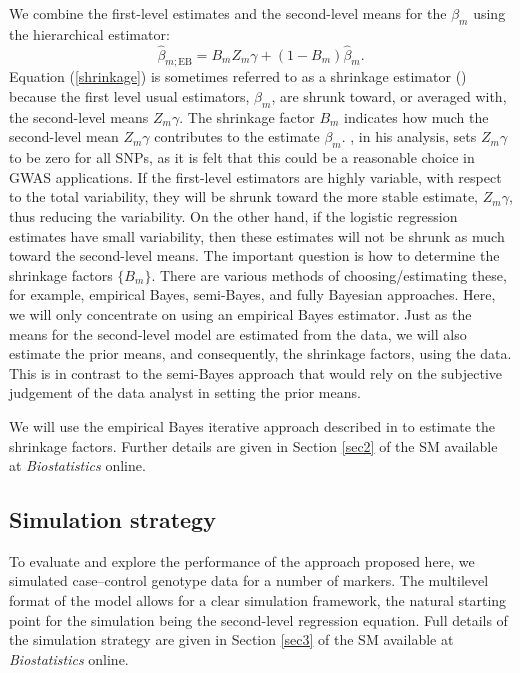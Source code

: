 We combine the first-level estimates and the second-level means
for the $\beta_m$ using the hierarchical estimator:
\begin{equation}
\hat{\beta}_{m; \mathrm{EB}} =
B_m Z_m \gamma + \left( 1 - B_m \right) \hat{\beta}_m.
\label{shrinkage}
\end{equation}
Equation (\ref{shrinkage}) is sometimes referred to as a
shrinkage estimator
(\citealp{TTC01})
because the first level usual
estimators, $\beta_m$, are shrunk toward, or averaged with,
the second-level means $Z_m \gamma$. The shrinkage factor
$B_m$ indicates how much the second-level mean $Z_m \gamma$
contributes to the estimate $\beta_m$.
\citet{Gichangi_Vach:2006},
in his analysis, sets $Z_m \gamma$ to be zero for all SNPs,
as it is felt that this could be a reasonable choice in GWAS
applications. If the first-level estimators are highly
variable, with respect to the total variability, they will
be shrunk toward the more stable estimate, $Z_m \gamma$,
thus reducing the variability. On the other hand, if the
logistic regression estimates have small variability, then
these estimates will not be shrunk as much toward the
second-level means. The important question is how to
determine the shrinkage factors $\{ B_m \}$. There are
various methods of choosing/estimating these, for example,
empirical Bayes, semi-Bayes, and fully Bayesian approaches.
Here, we will only concentrate on using an empirical Bayes
estimator. Just as the means for the second-level model are
estimated from the data, we will also estimate the prior means,
and consequently, the shrinkage factors, using the data.
This is in contrast to the semi-Bayes approach that would
rely on the subjective judgement of the data analyst in
setting the prior means.

We will use the empirical Bayes iterative approach described
in
\citet{Barlow_Bartholomew:1972}
to estimate the shrinkage factors. Further details are
given in Section \ref{sec2} of the SM available at
\textit{Biostatistics} online.


\subsection{Simulation strategy}

To evaluate and explore the performance of the approach
proposed here, we simulated case--control genotype data for
a number of markers. The multilevel format of the model allows
for a clear simulation framework, the natural starting point
for the simulation being the second-level regression equation.
Full details of the simulation strategy are given in
Section \ref{sec3} of the SM available at
\textit{Biostatistics} online.


